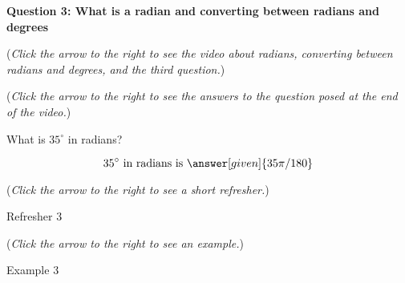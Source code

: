 \documentclass{ximera}
\begin{document}
\textbf{Question 3: What is a radian and converting between radians and degrees}
\begin{question}
\begin{flushright}
{\color{blue}(\emph{Click the arrow to the right to see the video about radians, converting between radians and degrees, and the third question.})}
\end{flushright}
\begin{center}
\begin{expandable}
\begin{flushright}
{\color{blue}(\emph{Click the arrow to the right to see the answers 
to the question posed at the end of the video.})}
\end{flushright}
\begin{expandable}
What is $35^\circ$ in radians?
\begin{prompt}
\[
35^\circ\text{ in radians is }\answer[given]{35 \pi / 180}
\]
\end{prompt}
\begin{flushright}
{\color{blue}(\emph{Click the arrow to the right to see a short refresher.})}
\end{flushright}
\begin{expandable}
\begin{center}
Refresher 3
\end{center}
\end{expandable}
\begin{flushright}
{\color{blue}(\emph{Click the arrow to the right to see an example.})}
\end{flushright}
\begin{expandable}
\begin{center}
Example 3
\end{center}
\end{expandable}
\end{expandable}
\end{expandable}
\end{center}
\end{question}
\end{document}
